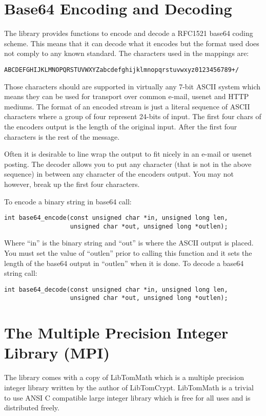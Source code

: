 \documentclass{book}
\begin{document}
\section{Base64 Encoding and Decoding}
The library provides functions to encode and decode a RFC1521 base64 coding scheme.  This means that it can decode what it 
encodes but the format used does not comply to any known standard.  The characters used in the mappings are:
\begin{verbatim}
ABCDEFGHIJKLMNOPQRSTUVWXYZabcdefghijklmnopqrstuvwxyz0123456789+/
\end{verbatim}
Those characters should are supported in virtually any 7-bit ASCII system which means they can be used for transport over
common e-mail, usenet and HTTP mediums.  The format of an encoded stream is just a literal sequence of ASCII characters
where a group of four represent 24-bits of input.  The first four chars of the encoders output is the length of the 
original input.  After the first four characters is the rest of the message.

Often it is desirable to line wrap the output to fit nicely in an e-mail or usenet posting.  The decoder allows you to
put any character (that is not in the above sequence) in between any character of the encoders output.  You may not however,
break up the first four characters.

To encode a binary string in base64 call:
   
\begin{verbatim}
int base64_encode(const unsigned char *in, unsigned long len, 
                  unsigned char *out, unsigned long *outlen);
\end{verbatim}
Where ``in'' is the binary string and ``out'' is where the ASCII output is placed.  You must set the value of ``outlen'' prior
to calling this function and it sets the length of the base64 output in ``outlen'' when it is done.  To decode a base64 
string call:
\begin{verbatim}
int base64_decode(const unsigned char *in, unsigned long len, 
                  unsigned char *out, unsigned long *outlen);
\end{verbatim}

\section{The Multiple Precision Integer Library (MPI)}
The library comes with a copy of LibTomMath  which is a multiple precision integer library written by the
author of LibTomCrypt.  LibTomMath is a trivial to use ANSI C compatible large integer library which is free 
for all uses and is distributed freely.
\end{document}
